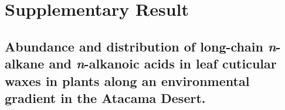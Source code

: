 \documentclass[
  authoryear,
  preprint,
  3p]{elsarticle}
\begin{document}
\hypertarget{supplementary-result}{%
\section{Supplementary Result}\label{supplementary-result}}

\hypertarget{abundance-and-distribution-of-long-chain-n-alkane-and-n-alkanoic-acids-in-leaf-cuticular-waxes-in-plants-along-an-environmental-gradient-in-the-atacama-desert.}{%
\subsection{\texorpdfstring{Abundance and distribution of long-chain
\emph{n}-alkane and \emph{n}-alkanoic acids in leaf cuticular waxes in
plants along an environmental gradient in the Atacama
Desert.}{Abundance and distribution of long-chain n-alkane and n-alkanoic acids in leaf cuticular waxes in plants along an environmental gradient in the Atacama Desert.}}\label{abundance-and-distribution-of-long-chain-n-alkane-and-n-alkanoic-acids-in-leaf-cuticular-waxes-in-plants-along-an-environmental-gradient-in-the-atacama-desert.}}
\end{document}
